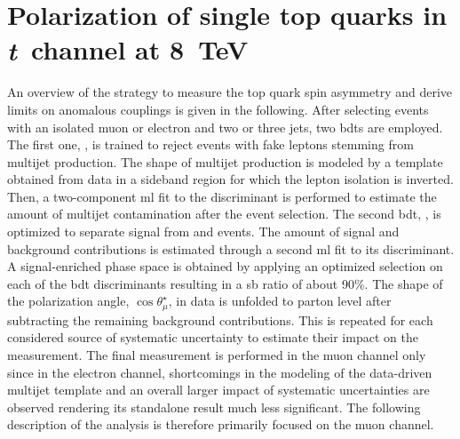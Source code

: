 \chapter{Polarization of single top quarks in \textsl{t}~channel at 8~TeV}



An overview of the strategy to measure the top quark spin asymmetry and derive limits on anomalous couplings is given in the following. After selecting events with an isolated muon or electron and two or three jets, two \glspl{bdt} are employed. The first one, \bdtqcd, is trained to reject events with fake leptons stemming from multijet production. The shape of multijet production is modeled by a template obtained from data in a sideband region for which the lepton isolation is inverted. Then, a two-component \gls{ml} fit to the \bdtqcd discriminant is performed to estimate the amount of multijet contamination after the event selection. The second \gls{bdt}, \bdttch, is optimized to separate signal from \wjets and \ttbar events. The amount of signal and background contributions is estimated through a second \gls{ml} fit to its discriminant. A signal-enriched phase space is obtained by applying an optimized selection on each of the \gls{bdt} discriminants resulting in a \gls{sb} ratio of about 90\%. The shape of the polarization angle, $\cos\theta^\star_{\mu}$, in data is unfolded to parton level after subtracting the remaining background contributions. This is repeated for each considered source of systematic uncertainty to estimate their impact on the measurement. The final measurement is performed in the muon channel only since in the electron channel, shortcomings in the modeling of the data-driven multijet template and an overall larger impact of systematic uncertainties are observed rendering its standalone result much less significant. The following description of the analysis is therefore primarily focused on the muon channel. 

